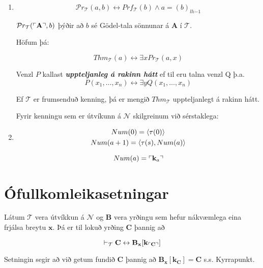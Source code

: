 \documentclass[12pt]{book}
\newcommand{\cT}{\mathcal{T}}
\newcommand{\cP}{\mathcal{P}}
\newcommand{\cN}{\mathcal{N}}
\newcommand{\bA}{\mathbf{A}}
\newcommand{\bB}{\mathbf{B}}
\newcommand{\bC}{\mathbf{C}}
\newcommand{\bx}{\mathbf{x}}
\newcommand{\bk}{\mathbf{k}}
\newcommand{\xxn}{x_1, \dotsc, x_n}
\newcommand{\dda}{\dot{-}}
\newcommand{\emphs}[1]{\textbf{\emph{#1}}}
\DeclarePairedDelimiter{\god}{\ulcorner}{\urcorner}
\begin{document}
\begin{enumerate}[(1)]
\item  
\[\cP r_{\cT} (a,b) \leftrightarrow Prf_{\cT}(b) \wedge a = (b)_{lh \dda 1} \]
 
\begin{ath}
  $\cP r_{\cT}(\god{\bA},b)$ þýðir að $b$ sé Gödel-tala sönnunar á $\bA$ í $\cT$.
\end{ath}

Höfum þá:

\begin{setn}
  \[Thm_{\cT} (a) \leftrightarrow \exists x Pr_{\cT} (a,x) \]
\end{setn}

\begin{skgr}
  Venzl $P$ kallast \emphs{uppteljanleg á rakinn hátt} ef til eru
  talna venzl Q þ.a.
  \[ P(\xxn) \leftrightarrow \exists y Q(\xxn) \]
\end{skgr}

\begin{setn}[Fylgisetning]
  Ef $\cT$ er frumsenduð kenning, þá er mengið
  $Thm_{\cT}$ uppteljanlegt á rakinn hátt.
\end{setn}

Fyrir kenningu sem er útvíkunn á 
$\cN$ skilgreinum við sérstaklega:

\item
  \begin{gather*}
    Num(0) = \langle\tau(0)\rangle\\
    Num(a+1) = \langle\tau(s), Num(a)\rangle
  \end{gather*}

  \begin{ath}
    \[Num(a) = \god{\bk_a} \]
  \end{ath}

\end{enumerate}


\section{Ófullkomleikasetningar}


\begin{setn}[Kyrrapunktssetning]
  Látum $\cT$ vera útvíkkun á
  $\cN$ og $\bB$ vera yrðingu sem hefur nákvæmlega
  eina frjálsa breytu $\bx$. Þá er til lokuð yrðing
  $\bC$ þannig að

  \[\vdash_{\cT} \bC \leftrightarrow \bB_{\bx} [\bk_{\god{\bC}}] \]

  Setningin segir að við getum fundið
  $\bC$ þannig að $\bB_{\bx}[\bk_{\bC}] = \bC$ s.s.
  Kyrrapunkt.
  
\end{setn}
\end{document}
